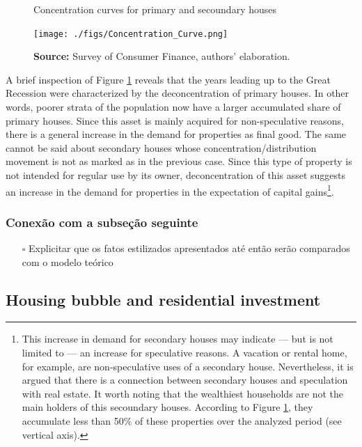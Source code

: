 \documentclass[11pt]{article}
\begin{document}
\begin{figure}[htb]
    \centering
        \caption{Concentration curves for primary and secoundary houses} 
    \texttt{[image: ./figs/Concentration\_Curve.png]}
    \label{fig:concentration}
    \caption*{\textbf{Source:} Survey of Consumer Finance, authors’ elaboration.}
\end{figure}


A brief inspection of Figure \ref{fig:concentration} reveals that the years leading up to the Great Recession were characterized by the deconcentration of primary houses. In other words, poorer strata of the population now have a larger accumulated share of primary houses. 
Since this asset is mainly acquired for non-speculative reasons, there is a general increase in the demand for properties as final good. The same cannot be said about secondary houses whose concentration/distribution movement is not as marked as in the previous case. Since this type of property is not intended for regular use by its owner, deconcentration of this asset suggests an increase in the demand for properties in the expectation of capital gains\footnote{This increase in demand for secondary houses may indicate --- but is not limited to --- an increase for speculative reasons. A vacation or rental home, for example, are non-speculative uses of a secondary house. Nevertheless, it is argued that there is a connection between secondary houses and speculation with real estate. It worth noting that the wealthiest households are not the main holders of this secoundary houses. According to Figure \ref{fig:concentration}, they accumulate less than 50\% of these properties over the analyzed period (see vertical axis).}.

\subsubsection{Conexão com a subseção seguinte}
\label{sec:org3a8a49b}


\begin{itemize}
\item[{$\square$}] Explicitar que os fatos estilizados apresentados até então serão comparados com o modelo teórico
\end{itemize}

\subsection{Housing bubble and residential investment}
\label{sec:org07d8e9b}
\end{document}
